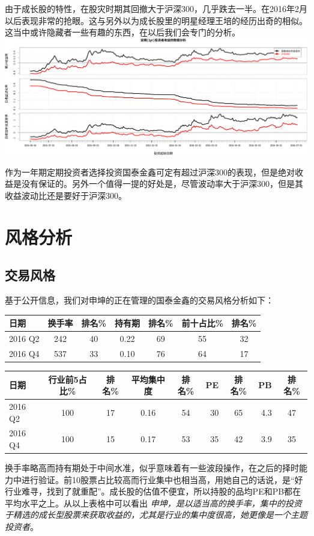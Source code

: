 \documentclass[hyperref,]{ctexart}
\begin{document}
由于成长股的特性，在股灾时期其回撤大于沪深300，几乎跌去一半。在2016年2月以后表现非常的抢眼。这与另外以为成长股里的明星经理王培的经历出奇的相似。这当中或许隐藏者一些有趣的东西，在以后我们会专门的分析。
\includegraphics{shenkun-details_files/figure-latex/unnamed-chunk-5-1.pdf}

作为一年期定期投资者选择投资国泰金鑫可定有超过沪深300的表现，但是绝对收益是没有保证的。另外一个值得一提的好处是，尽管波动率大于沪深300，但是其收益波动比还是要好于沪深300。

\section{风格分析}

\subsection{交易风格}

基于公开信息，我们对申坤的正在管理的国泰金鑫的交易风格分析如下：

\begin{longtable}[]{@{}lcccccc@{}}
\toprule
日期 & 换手率 & 排名\% & 持有期 & 排名\% & 前十占比\% &
排名\%\tabularnewline
\midrule
\endhead
2016 Q2 & 242 & 40 & 0.22 & 69 & 55 & 32\tabularnewline
2016 Q4 & 537 & 33 & 0.10 & 76 & 64 & 17\tabularnewline
\bottomrule
\end{longtable}

\begin{longtable}[]{@{}lccccrcrc@{}}
\toprule
日期 & 行业前5占比\% & 排名\% & 平均集中度 & 排名\% & PE & 排名\% & PB &
排名\%\tabularnewline
\midrule
\endhead
2016 Q2 & 100 & 17 & 0.16 & 54 & 30 & 65 & 4.3 & 47\tabularnewline
2016 Q4 & 100 & 15 & 0.17 & 53 & 35 & 42 & 3.9 & 35\tabularnewline
\bottomrule
\end{longtable}

换手率略高而持有期处于中间水准，似乎意味着有一些波段操作，在之后的择时能力中进行验证。前10股票占比较高而行业集中也相当高，用她自己的话说，是``好行业难寻，找到了就重配''。成长股的估值不便宜，所以持股的品均PE和PB都在平均水平之上。从以上表格中可以看出
\emph{申坤，是以适当高的换手率，集中的投资于精选的成长型股票来获取收益的，尤其是行业的集中度很高，她更像是一个主题投资者}。
\end{document}
